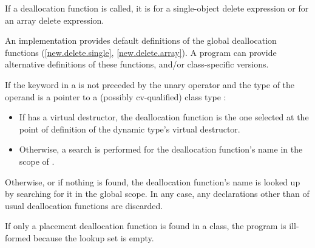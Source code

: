 \pnum
If a deallocation function is called,
it is  for a single-object delete expression or
 for an array delete expression.
\begin{note}
%
An implementation provides default definitions of the global
deallocation functions (\ref{new.delete.single}, \ref{new.delete.array}).
A \Cpp{} program can provide alternative definitions of these
functions, and/or class-specific
versions.
\end{note}

\pnum
If the keyword  in a 
is not preceded by the unary \tcode{::} operator and the type of the operand is
a pointer to a (possibly cv-qualified) class type :
\begin{itemize}
\item
If  has a virtual destructor,
the deallocation function is the one selected at the point of definition of
the dynamic type's virtual destructor.
\item
Otherwise,
a search is performed for the deallocation function's name
in the scope of .
\end{itemize}
Otherwise, or if nothing is found,
the deallocation function's name is looked up by
searching for it in the global scope.
In any case, any declarations
other than of usual deallocation functions
are discarded.
\begin{note}
If only a placement deallocation function is found in a class,
the program is ill-formed because the lookup set is empty.
\end{note}

